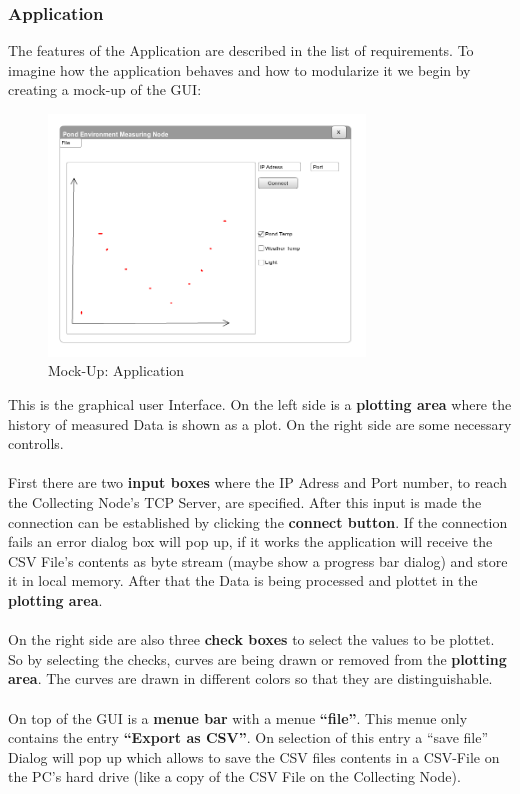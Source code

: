 \documentclass[
	11pt,
	a4paper
]{article}%
\begin{document}
\subsubsection{Application}
The features of the Application are described in the list of requirements. To imagine how the application behaves and how to modularize it we begin by creating a mock-up of the GUI:
\begin{figure}[h!]
  \caption{Mock-Up: Application}
  \centering
    \includegraphics[width=0.75\textwidth]{../Images/Application.png}
\end{figure}
This is the graphical user Interface. On the left side is a \textbf{plotting area} where the history of measured Data is shown as a plot. On the right side are some necessary controlls.
\\\\
First there are two \textbf{input boxes} where the IP Adress and Port number, to reach the Collecting Node's TCP Server, are specified. After this input is made the connection can be established by clicking the \textbf{connect button}. If the connection fails an error dialog box will pop up, if it works the application will receive the CSV File's contents as byte stream (maybe show a progress bar dialog) and store it in local memory. After that the Data is being processed and plottet in the \textbf{plotting area}.
\\\\
On the right side are also three \textbf{check boxes} to select the values to be plottet. So by selecting the checks, curves are being drawn or removed from the \textbf{plotting area}. The curves are drawn in different colors so that they are distinguishable.
\\\\
On top of the GUI is a \textbf{menue bar} with a menue \textbf{“file”}. This menue only contains the entry \textbf{“Export as CSV”}. On selection of this entry a “save file” Dialog will pop up which allows to save the CSV files contents in a CSV-File on the PC's hard drive (like a copy of the CSV File on the Collecting Node).
\end{document}

